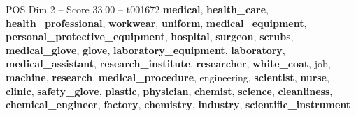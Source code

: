 \begin{textsample}{POS Dim 2 – Score 33.00 – t001672}  \label{ex:f2_pos_003}
\textbf{medical}, \textbf{health\_care}, \textbf{health\_professional}, \textbf{workwear}, \textbf{uniform}, \textbf{medical\_equipment}, \textbf{personal\_protective\_equipment}, \textbf{hospital}, \textbf{surgeon}, \textbf{scrubs}, \textbf{medical\_glove}, \textbf{glove}, \textbf{laboratory\_equipment}, \textbf{laboratory}, \textbf{medical\_assistant}, \textbf{research\_institute}, \textbf{researcher}, \textbf{white\_coat}, job, \textbf{machine}, \textbf{research}, \textbf{medical\_procedure}, engineering, \textbf{scientist}, \textbf{nurse}, \textbf{clinic}, \textbf{safety\_glove}, \textbf{plastic}, \textbf{physician}, \textbf{chemist}, \textbf{science}, \textbf{cleanliness}, \textbf{chemical\_engineer}, \textbf{factory}, \textbf{chemistry}, \textbf{industry}, \textbf{scientific\_instrument}

\end{textsample}
